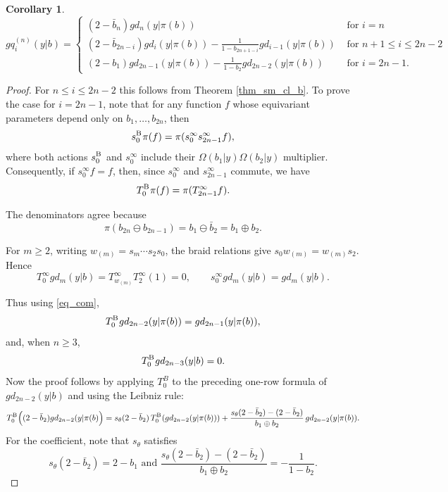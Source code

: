 \documentclass[a4paper]{amsart}
\newtheorem{cor}[thm]{Corollary}
\theoremstyle{remark}
\numberwithin{equation}{section}
\begin{document}
\begin{cor}\label{cor_per_cl_k}
\[ gq_{i}^{(n)}(y| b)=
\begin{cases}
   (2-\bar{b}_n) gd_n(y| \pi(b))& \text{ for } i=n\\
     (2-\bar{b}_{2n-i}) gd_i(y| \pi(b))-\frac{1}{1-b_{2n+1-i}}gd_{i-1}(y| \pi(b))& \text{ for } n+1\leq i\leq 2n-2\\
      (2-{b}_{1}) gd_{2n-1}(y| \pi(b))-\frac{1}{1-b_{2}}gd_{2n-2}(y| \pi(b))& \text{ for } i= 2n-1.
\end{cases}\]
\end{cor}
\begin{proof}
For $n\leq i\leq 2n-2$ this follows from Theorem \ref{thm_sm_cl_b}. 
To prove the case for $i=2n-1$, note that for any function $f$ whose equivariant parameters depend only on \(b_1,\ldots,b_{2n}\), then
\[
s_0^{\mathrm{B}_{}
}\pi(f)=\pi(s_0^\infty s_{2n-1}^\infty f),
\]
where both actions $s_0^{\mathrm{B}_{}}$ and $s_0^\infty$ include their
\(\Omega(b_1| y)\Omega(b_2| y)\) multiplier.
Consequently, if $s_0^\infty f=f$,
then, since \(s_0^\infty\) and \(s_{2n-1}^\infty\) commute, we have
\begin{equation}\label{eq_com}
    T_0^{\mathrm{B}_{}}\pi(f)=\pi(T_{2n-1}^\infty f).
\end{equation}

The denominators agree because
\[
\pi(b_{2n}\ominus b_{2n-1})
=
b_1\ominus\bar b_2
=
b_1\oplus b_2.
\]

For \(m\ge2\), writing \(w_{(m)}=s_m\cdots s_2s_0\), the
braid relations give \(s_0w_{(m)}=w_{(m)}s_2\). Hence
\[
T_0^\infty gd_m(y| b)
=T_{w_{(m)}}^\infty T_2^\infty(1)=0,
\qquad
s_0^\infty gd_m(y| b)=gd_m(y| b).
\]


Thus using \eqref{eq_com},
\[
T_0^{\mathrm{B}_{}} gd_{2n-2}(y| \pi(b))=gd_{2n-1}(y| \pi(b)),
\]
and, when \(n\ge3\),
\[
T_0^{\mathrm{B}_{}} gd_{2n-3}(y| b)=0.
\]
Now the proof follows by applying \(T_0^B\) to the preceding one-row formula of $gd_{2n-2}(y| b)$ and using the Leibniz rule:
\[
T_0^{\mathrm{B}_{}}\Big((2-\bar{b}_2)gd_{2n-2}(y| \pi(b)\Big)
=s_\theta(2-\bar{b}_2)\,T_0^{\mathrm{B}_{}}(gd_{2n-2}(y| \pi(b)))
+\frac{s_\theta(2-\bar{b}_2)-(2-\bar{b}_2)}{b_1\oplus b_2}\,gd_{2n-2}(y| \pi(b)).
\]
For the coefficient, note that \(s_\theta\) satisfies
\[
s_\theta(2-\bar b_2)=2-b_1 \text{ and }
\frac{s_\theta(2-\bar b_2)-(2-\bar b_2)}
     {b_1\oplus b_2}
=
-\frac1{1-b_2}.
\]
\end{proof}
\end{document}
